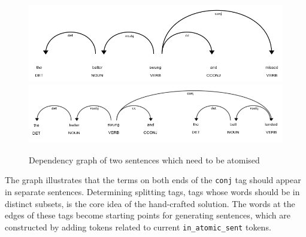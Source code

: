 \begin{figure}[h]
\caption{Dependency graph of two sentences which need to be atomised}
\centering
\includegraphics[width=\textwidth]{solving-nlp-tasks-logically/dependency-graph-one-subj.png}
\includegraphics[width=\textwidth]{solving-nlp-tasks-logically/dependency-graph-two-subj.png}
\label{atomisation-examples}
\end{figure}

The graph illustrates that the terms on both ends of the \verb_conj_ tag should appear in separate sentences. 
Determining splitting tags, tags whose words should be in distinct subsets, is the core idea of the hand-crafted solution.
The words at the edges of these tags become starting points for generating sentences, which are constructed by adding tokens related to current \verb+in_atomic_sent+ tokens.

